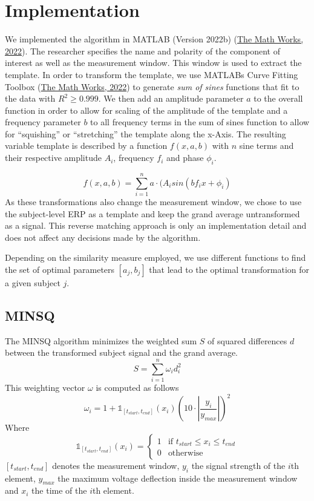 \documentclass[
  man]{apa7}
\begin{document}
\hypertarget{implementation}{%
\section{Implementation}\label{implementation}}

We implemented the algorithm in MATLAB (Version 2022b) (\protect\hyperlink{ref-matlab2022b}{The Math Works, 2022}). The researcher specifies the name and polarity of the component of interest as well as the measurement window. This window is used to extract the template. In order to transform the template, we use MATLABs Curve Fitting Toolbox (\protect\hyperlink{ref-matlab2022b}{The Math Works, 2022}) to generate \emph{sum of sines} functions that fit to the data with \(R^2 \ge 0.999\). We then add an amplitude parameter \(a\) to the overall function in order to allow for scaling of the amplitude of the template and a frequency parameter \(b\) to all frequency terms in the sum of sines function to allow for ``squishing'' or ``stretching'' the template along the x-Axis. The resulting variable template is described by a function \(f(x, a, b)\) with \(n\) sine terms and their respective amplitude \(A_i\), frequency \(f_i\) and phase \(\phi_i\).

\[f(x, a, b) = \sum_{i = 1}^{n} a\cdot(A_isin(bf_ix + \phi_i)\]
As these transformations also change the measurement window, we chose to use the subject-level ERP as a template and keep the grand average untransformed as a signal. This reverse matching approach is only an implementation detail and does not affect any decisions made by the algorithm.

Depending on the similarity measure employed, we use different functions to find the set of optimal parameters \([a_j, b_j]\) that lead to the optimal transformation for a given subject \(j\).

\hypertarget{minsq}{%
\subsection{MINSQ}\label{minsq}}

The MINSQ algorithm minimizes the weighted sum \(S\) of squared differences \(d\) between the transformed subject signal and the grand average.
\[S = \sum_{i = 1}^{n}\omega_{i}d_{i}^2\]
This weighting vector \(\omega\) is computed as follows
\[\omega_i = 1+\mathbb{1}_{[t_{start}, t_{end}]}(x_i)(10 \cdot |\frac{y_i}{y_{max}}|)^2\]
Where
\[\mathbb{1}_{[t_{start}, t_{end}]}(x_i) = \begin{cases} 1 & \text{if $t_{start} \le x_i \le t_{end}$} \\ 0 & \text{otherwise}\end{cases}\]\([t_{start}, t_{end}]\) denotes the measurement window, \(y_{i}\) the signal strength of the \(i\)th element, \(y_{max}\) the maximum voltage deflection inside the measurement window and \(x_i\) the time of the \(i\)th element.
\end{document}
